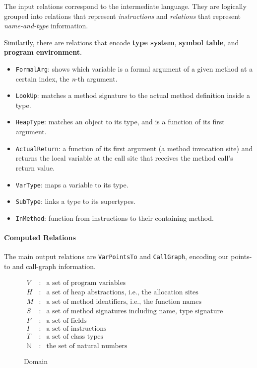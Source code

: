 The input relations correspond to the intermediate language. They are
logically grouped into relations that represent \textit{instructions}
and \textit{relations} that represent \textit{name-and-type}
information.

Similarily, there are relations that encode \textbf{type system},
\textbf{symbol table}, and \textbf{program environment}.
\begin{itemize}
\item \texttt{FormalArg}: shows which variable is a formal argument of
  a given method at a certain index, the \textit{n}-th argument.
\item \texttt{LookUp}: matches a method signature to the actual method
  definition inside a type.
\item \texttt{HeapType}: matches an object to its type, and is a
  function of its first argument.
\item \texttt{ActualReturn}: a function of its first argument (a
  method invocation site) and returns the local variable at the call
  site that receives the method call's return value.
\item \texttt{VarType}: maps a variable to its type.
\item \texttt{SubType}: links a type to its supertypes.
\item \texttt{InMethod}: function from instructions to their
  containing method.
\end{itemize}


\paragraph{Computed Relations}

The main output relations are \texttt{VarPointsTo} and
\texttt{CallGraph}, encoding our points-to and call-graph information.


\begin{figure}[ht]
  \centering

  \begin{math}
    \begin{array}{lcl}
      V & : & \text{a set of program variables} \\
      H & : & \text{a set of heap abstractions, i.e., the allocation sites} \\
      M & : & \text{a set of method identifiers, i.e., the function names} \\
      S & : & \text{a set of method signatures including name, type signature} \\
      F & : & \text{a set of fields} \\
      I & : & \text{a set of instructions} \\
      T & : & \text{a set of class types} \\
      \mathbb{N} & : & \text{the set of natural numbers}
    \end{array}
  \end{math}

  \caption{Domain}
  \label{fig:pta-domain}
\end{figure}


